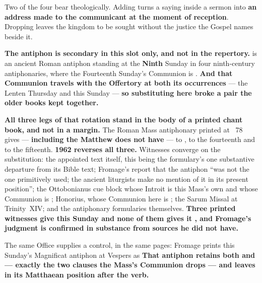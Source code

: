 Two of the four bear theologically. Adding  turns a saying
inside a sermon into \textbf{an address made to the communicant at the moment
of reception}. Dropping  leaves the kingdom to be
sought without the justice the Gospel names beside it.

\textbf{The antiphon is secondary in this slot only, and not in the
repertory.}  is an ancient Roman antiphon standing at the
\textbf{Ninth} Sunday in four ninth-century antiphonaries, where the Fourteenth
Sunday's Communion is . \textbf{And that Communion
travels with the Offertory  at both its occurrences} ---
the Lenten Thursday and this Sunday --- \textbf{so substituting  here broke a pair the older books kept together.}

\textbf{All three legs of that rotation stand in the body of a printed chant
book, and not in a margin.} The Roman Mass antiphonary printed at
~78 gives  --- \textbf{including the  Matthew does not have} --- to ,  to the fourteenth and  to the
fifteenth. \textbf{1962 reverses all three.} Witnesses converge on the
substitution: the appointed text itself, this being the formulary's one
substantive departure from its Bible text; Fromage's report that the antiphon
``was not the one primitively used; the ancient liturgists make no mention of it
in its present position''; the Ottobonianus cue block whose Introit is this
Mass's own and whose Communion is ; Honorius, whose
Communion here is ; the Sarum Missal at Trinity~XIV;
and the antiphonary formularies themselves. \textbf{Three printed witnesses give
this Sunday  and none of them gives it
, and Fromage's judgment is confirmed in substance from
sources he did not have.}

The same Office supplies a control, in the same pages: Fromage prints this Sunday's Magnificat antiphon
at Vespers as  \textbf{That antiphon retains both
 and  --- exactly the two clauses the
Mass's Communion drops --- and leaves  in its Matthaean position
after the verb.}

